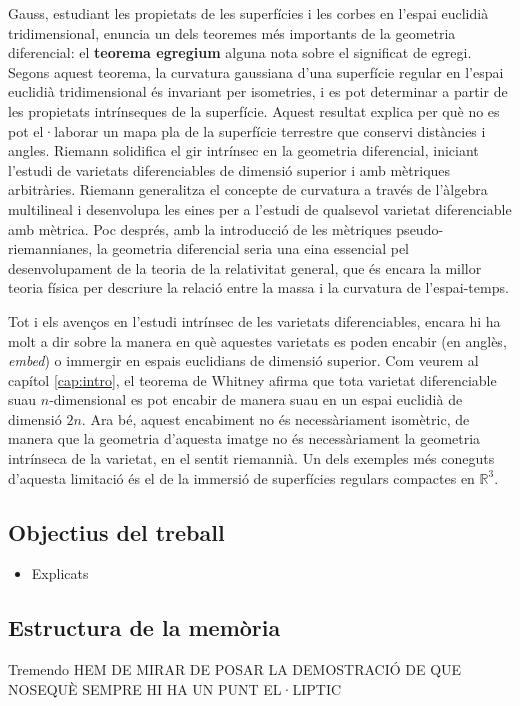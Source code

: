 Gauss, estudiant les propietats de les superfícies i les corbes en l'espai euclidià tridimensional, enuncia un dels teoremes més importants de la geometria diferencial: el \textbf{teorema egregium} {\color{blue} alguna nota sobre el significat de egregi}. Segons aquest teorema, la curvatura gaussiana d'una superfície regular en l'espai euclidià tridimensional és invariant per isometries, i es pot determinar a partir de les propietats intrínseques de la superfície. Aquest resultat explica per què no es pot el·laborar un mapa pla de la superfície terrestre que conservi distàncies i angles.
Riemann solidifica el gir intrínsec en la geometria diferencial, iniciant l'estudi de varietats diferenciables de dimensió superior i amb mètriques arbitràries. Riemann generalitza el concepte de curvatura a través de l'àlgebra multilineal i desenvolupa les eines per a l'estudi de qualsevol varietat diferenciable amb mètrica. Poc després, amb la introducció de les mètriques pseudo-riemannianes, la geometria diferencial seria una eina essencial pel desenvolupament de la teoria de la relativitat general, que és encara la millor teoria física per descriure la relació entre la massa i la curvatura de l'espai-temps.

Tot i els avenços en l'estudi intrínsec de les varietats diferenciables, encara hi ha molt a dir sobre la manera en què aquestes varietats es poden encabir (en anglès, \textit{embed}) o immergir en espais euclidians de dimensió superior. Com veurem al capítol \ref{cap:intro}, el teorema de Whitney afirma que tota varietat diferenciable suau $n$-dimensional es pot encabir de manera suau en un espai euclidià de dimensió $2n$. Ara bé, aquest encabiment no és necessàriament isomètric, de manera que la geometria d'aquesta imatge no és necessàriament la geometria intrínseca de la varietat, en el sentit riemannià. Un dels exemples més coneguts d'aquesta limitació és el de la immersió de superfícies regulars compactes en $\mathbb R^3$.


\subsection*{Objectius del treball}



\begin{itemize}
    \item Explicats
\end{itemize}

\subsection*{Estructura de la mem\`oria}
Tremendo
HEM DE MIRAR DE POSAR LA DEMOSTRACIÓ DE QUE NOSEQUÈ SEMPRE HI HA UN PUNT EL·LIPTIC
